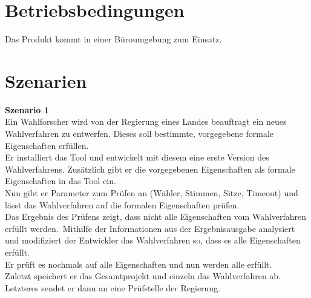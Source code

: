 \documentclass[a4paper]{scrreprt}
\begin{document}
\section{Betriebsbedingungen}
Das Produkt kommt in einer Büroumgebung zum Einsatz.


\section{Szenarien}
\textbf{Szenario 1}\\
Ein Wahlforscher wird von der Regierung eines Landes beauftragt ein neues Wahlverfahren zu entwerfen. Dieses soll bestimmte, vorgegebene formale Eigenschaften erfüllen.\\
Er installiert das Tool und entwickelt mit diesem eine erste Version des Wahlverfahrens. Zusätzlich gibt er die vorgegebenen Eigenschaften als formale Eigenschaften in das Tool ein.\\
Nun gibt er Parameter zum Prüfen an (Wähler, Stimmen, Sitze, Timeout) und lässt das Wahlverfahren auf die formalen Eigenschaften prüfen.\\
Das Ergebnis des Prüfens zeigt, dass nicht alle Eigenschaften vom Wahlverfahren erfüllt werden.\
Mithilfe der Informationen aus der Ergebnisausgabe analysiert und modifiziert der Entwickler das Wahlverfahren so, dass es alle Eigenschaften erfüllt.\\
Er prüft es nochmals auf alle Eigenschaften und nun werden alle erfüllt.\\
Zuletzt speichert er das Gesamtprojekt und einzeln das Wahlverfahren ab. Letzteres sendet er dann an eine Prüfstelle der Regierung.
\end{document}
